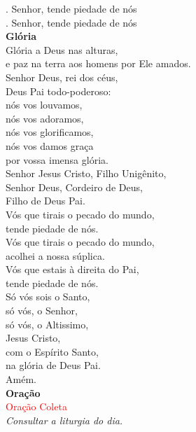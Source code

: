 \documentclass{book}
\begin{document}
\begin{flushleft}
    {\color{red} \Vbar.} Senhor, tende piedade de nós \\
    {\color{red} \Rbar.} Senhor, tende piedade de nós
    \vspace{.2cm} \\
    \textbf{Glória}
    \vspace{.2cm} \\
    Glória a Deus nas alturas, \\
    e paz na terra aos homens por Ele amados. \\
    Senhor Deus, rei dos céus, \\
    Deus Pai todo-poderoso: \\
    nós vos louvamos, \\
    nós vos adoramos, \\
    nós vos glorificamos, \\
    nós vos damos graça \\
    por vossa imensa glória. \\
    Senhor Jesus Cristo, Filho Unigênito, \\
    Senhor Deus, Cordeiro de Deus, \\
    Filho de Deus Pai. \\
    Vós que tirais o pecado do mundo, \\
    tende piedade de nós. \\
    Vós que tirais o pecado do mundo, \\
    acolhei a nossa súplica. \\
    Vós que estais à direita do Pai, \\
    tende piedade de nós. \\
    Só vós sois o Santo, \\
    só vós, o Senhor, \\
    só vós, o Altissimo, \\
    Jesus Cristo, \\
    com o Espírito Santo, \\
    na glória de Deus Pai. \\
    Amém.
    \vspace{.2cm} \\
    \textbf{Oração}
    \vspace{.2cm} \\
    \textcolor{red}{Oração Coleta} \\
    \textit{Consultar a liturgia do dia.}
    \vspace{.2cm} \\
\end{flushleft}
\end{document}

